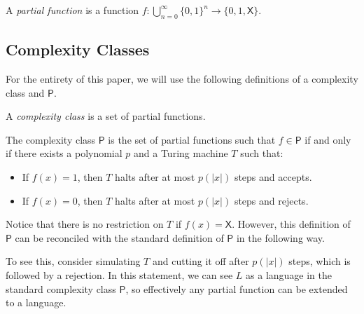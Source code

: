 \documentclass[11pt]{article}
\newcommand{\p}{\textsf{P}}
\newcommand{\x}{\textsf{X}}
\begin{document}
\begin{definition}\label{partialfunction}
A \emph{partial function} is a function $f: \bigcup_{n=0}^{\infty}\{0,1\}^n \to \{0,1,\x\}$.
\end{definition}

\subsection{Complexity Classes}

For the entirety of this paper, we will use the following definitions of a complexity class and $\p$.

\begin{definition}\label{complexityclass}
A \emph{complexity class} is a set of partial functions.
\end{definition}

\begin{definition}\label{p}
The complexity class $\p$ is the set of partial functions such that $f \in \p$ if and only if there exists a polynomial $p$ and a Turing machine $T$ such that:
\begin{itemize}
\item If $f(x) = 1$, then $T$ halts after at most $p(|x|)$ steps and accepts.
\item If $f(x) = 0$, then $T$ halts after at most $p(|x|)$ steps and rejects.
\end{itemize}
\end{definition}

Notice that there is no restriction on $T$ if $f(x) = \x$. However, this definition of $\p$ can be reconciled with the standard definition of $\p$ in the following way.


To see this, consider simulating $T$ and cutting it off after $p(|x|)$ steps, which is followed by a rejection. In this statement, we can see $L$ as a language in the standard complexity class $\p$, so effectively any partial function can be extended to a language.
\end{document}
